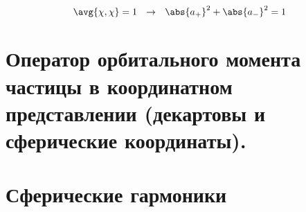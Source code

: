 $$
\avg{\chi, \chi} = 1 ~~\rightarrow ~~ \abs{a_{+}}^2 + \abs{a_{-}}^2 = 1
$$

\section{Оператор орбитального момента частицы в координатном представлении (декартовы и сферические координаты).}


\section{Сферические гармоники}
